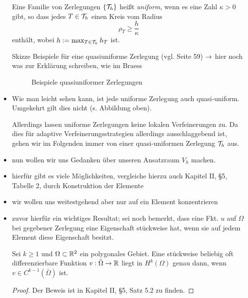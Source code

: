 \begin{itemize}
\begin{defi}
Eine Familie von Zerlegungen $\{\mathcal T_h\}$ heißt \textit{uniform}, wenn es eine Zahl $\kappa > 0$ gibt, so dass jedes $T \in \mathcal T_h$ einen Kreis vom Radius
\[
	\rho_T \ge \frac{h}\kappa
\]
enthält, wobei $h := \max_{T \in \mathcal T_h} h_T$ ist.
\end{defi}

\item[Skizze] Beispiele für eine quasiuniforme Zerlegung (vgl. \cite{BraeFEM} Seite 59) $\rightarrow$ hier noch was zur Erklärung schreiben, wie im Braess

\begin{figure}[h]
\caption{Beispiele quasiuniformer Zerlegungen}
\end{figure}

\item \begin{bem}
Wie man leicht sehen kann, ist jede uniforme Zerlegung auch quasi-uniform. Umgekehrt gilt dies nicht (s. Abbildung oben).

Allerdings lassen uniforme Zerlegungen keine lokalen Verfeinerungen zu. Da dies für adaptive Verfeinerungsstrategien allerdings ausschlaggebend ist, gehen wir im Folgenden immer von einer quasi-uniformen Zerlegung $\mathcal T_h$ aus.
\end{bem}

\item nun wollen wir uns Gedanken über unseren Ansatzraum $V_h$ machen.

\item hierfür gibt es viele Möglichkeiten, vergleiche hierzu auch \cite{BraeFEM} Kapitel II, \S5, Tabelle 2, durch Konstruktion der Elemente

\item wir wollen uns weitestgehend aber nur auf ein Element konzentrieren

\item zuvor hierfür ein wichtiges Resultat; sei noch bemerkt, dass eine Fkt. $u$ auf $\Omega$ bei gegebener Zerlegung eine Eigenschaft stückweise hat, wenn sie auf jedem Element diese Eigenschaft besitzt.
\begin{satz}
Sei $k \ge 1$ und $\Omega\subset \mathbb{R}^2$ ein polygonales Gebiet. Eine stückweise beliebig oft differenzierbare Funktion $v : \bar \Omega \rightarrow \mathbb{R}$ liegt in $H^k(\Omega)$ genau dann, wenn $v \in C^{k-1}(\bar\Omega)$ ist.
\end{satz}

\begin{proof}
Der Beweis ist in \cite{BraeFEM} Kapitel II, \S5, Satz 5.2 zu finden.
\end{proof}


\end{itemize}
